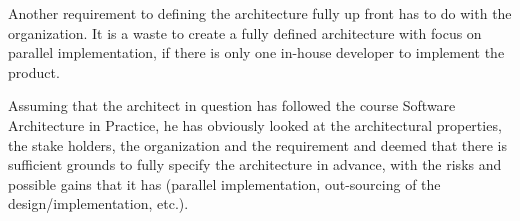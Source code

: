 Another requirement to defining the architecture fully up front has to do with the organization. It is a waste to create a fully defined architecture with focus on parallel implementation, if there is only one in-house developer to implement the product.

Assuming that the architect in question has followed the course Software Architecture in Practice, he has obviously looked at the architectural properties, the stake holders, the organization and the requirement and deemed that there is sufficient grounds to fully specify the architecture in advance, with the risks and possible gains that it has (parallel implementation, out-sourcing of the design/implementation, etc.).
